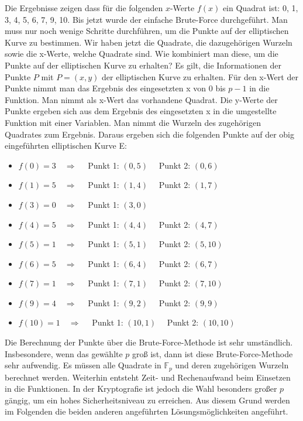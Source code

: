 Die Ergebnisse zeigen dass für die folgenden $x$-Werte $f(x)$ ein Quadrat ist: 0, 1, 3, 4, 5, 6, 7, 9, 10. Bis jetzt wurde der einfache Brute-Force durchgeführt. Man muss nur noch wenige Schritte durchführen, um die Punkte auf der elliptischen Kurve zu bestimmen. Wir haben jetzt die Quadrate, die dazugehörigen Wurzeln sowie die x-Werte, welche Quadrate sind. Wie kombiniert man diese, um die Punkte auf der elliptischen Kurve zu erhalten? Es gilt, die Informationen der Punkte $P$ mit $P = (x, y)$ der elliptischen Kurve zu erhalten. Für den x-Wert der Punkte nimmt man das Ergebnis des eingesetzten x von $0$ bis $p - 1$ in die Funktion. Man nimmt als x-Wert das vorhandene Quadrat. Die y-Werte der Punkte ergeben sich aus dem Ergebnis des eingesetzten x in die umgestellte Funktion mit einer Variablen. Man nimmt die Wurzeln des zugehörigen Quadrates zum Ergebnis. Daraus ergeben sich die folgenden Punkte auf der obig eingeführten elliptischen Kurve E:

\begin{itemize}
\item $f(0) = 3 \quad \Longrightarrow \quad$ Punkt 1: $(0, 5) \quad$ Punkt 2: $(0, 6)$
\item $f(1) = 5 \quad \Longrightarrow \quad$ Punkt 1: $(1, 4) \quad$ Punkt 2: $(1, 7)$
\item $f(3) = 0 \quad \Longrightarrow \quad$ Punkt 1: $(3, 0)$
\item $f(4) = 5 \quad \Longrightarrow \quad$ Punkt 1: $(4, 4) \quad$ Punkt 2: $(4, 7)$
\item $f(5) = 1 \quad \Longrightarrow \quad$ Punkt 1: $(5, 1) \quad$ Punkt 2: $(5, 10)$
\item $f(6) = 5 \quad \Longrightarrow \quad$ Punkt 1: $(6, 4) \quad$ Punkt 2: $(6, 7)$
\item $f(7) = 1 \quad \Longrightarrow \quad$ Punkt 1: $(7, 1) \quad$ Punkt 2: $(7, 10)$
\item $f(9) = 4 \quad \Longrightarrow \quad$ Punkt 1: $(9, 2) \quad$ Punkt 2: $(9, 9)$
\item $f(10) = 1 \quad \Longrightarrow \quad$ Punkt 1: $(10, 1) \quad$ Punkt 2: $(10, 10)$
\end{itemize}

Die Berechnung der Punkte über die Brute-Force-Methode ist sehr umständlich. Insbesondere, wenn das gewählte $p$ groß ist, dann ist diese Brute-Force-Methode sehr aufwendig. Es müssen alle Quadrate in $\mathbb{F}_{p}$ und deren zugehörigen Wurzeln berechnet werden. Weiterhin entsteht Zeit- und Rechenaufwand beim Einsetzen in die Funktionen. In der Kryptografie ist jedoch die Wahl besonders großer $p$ gängig, um ein hohes Sicherheitsniveau zu erreichen. Aus diesem Grund werden im Folgenden die beiden anderen angeführten Lösungsmöglichkeiten angeführt. 

